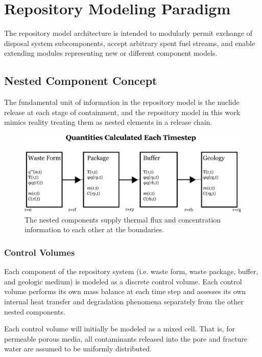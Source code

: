 \section{Repository Modeling Paradigm}

The repository model architecture is intended to modularly permit 
exchange of disposal system subcomponents, accept arbitrary spent fuel 
streams, and enable extending modules representing new or different 
component models.

\subsection{Nested Component Concept}

The fundamental unit of information in the repository model is the 
nuclide release at each stage of containment, and the repository model 
in this work mimics reality treating them as nested elements in a 
release chain.

\begin{figure}[h!]
  \begin{center}
    \includegraphics[width=\textwidth]{./chapters/paradigm/flow.eps}
  \end{center}
  \caption{The nested components supply thermal flux and concentration 
  information to each other at the boundaries.}
  \label{fig:flow}
\end{figure}


\subsubsection{Control Volumes}

Each component of the repository system (i.e. waste form, waste package, buffer, 
and geologic medium) is modeled as a discrete control volume. Each control 
volume performs its own mass balance at each time step and assesses its own 
internal  heat transfer and degradation phenomena separately from the other 
nested components.

Each control volume will initially be modeled as a mixed cell. That is, for 
permeable porous media, all contaminants released into the pore and fracture 
water are assumed to be uniformly distributed.  

